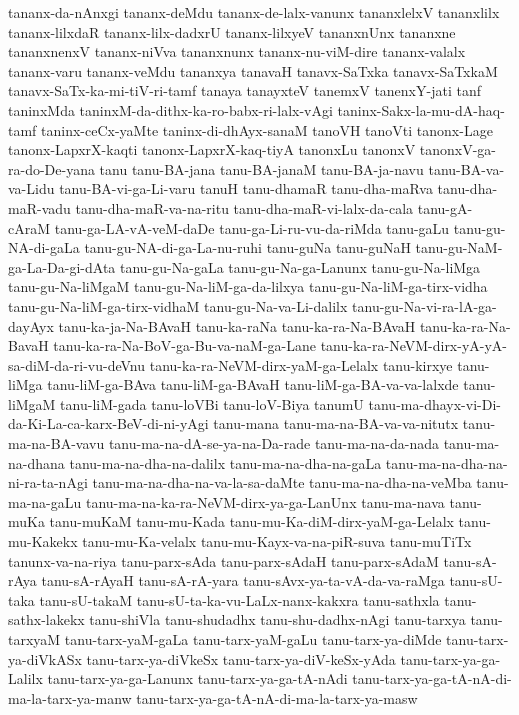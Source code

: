 {tananx-da-nAnxgi
tananx-deMdu
tananx-de-lalx-vanunx
tananxlelxV
tananxlilx
tananx-lilxdaR
tananx-lilx-dadxrU
tananx-lilxyeV
tananxnUnx
tananxne
tananxnenxV
tananx-niVva
tananxnunx
tananx-nu-viM-dire
tananx-valalx
tananx-varu
tananx-veMdu
tananxya
tanavaH
tanavx-SaTxka
tanavx-SaTxkaM
tanavx-SaTx-ka-mi-tiV-ri-tamf
tanaya
tanayxteV
tanemxV
tanenxY-jati
tanf
taninxMda
taninxM-da-dithx-ka-ro-babx-ri-lalx-vAgi
taninx-Sakx-la-mu-dA-haq-tamf
taninx-ceCx-yaMte
taninx-di-dhAyx-sanaM
tanoVH
tanoVti
tanonx-Lage
tanonx-LapxrX-kaqti
tanonx-LapxrX-kaq-tiyA
tanonxLu
tanonxV
tanonxV-ga-ra-do-De-yana
tanu
tanu-BA-jana
tanu-BA-janaM
tanu-BA-ja-navu
tanu-BA-va-va-Lidu
tanu-BA-vi-ga-Li-varu
tanuH
tanu-dhamaR
tanu-dha-maRva
tanu-dha-maR-vadu
tanu-dha-maR-va-na-ritu
tanu-dha-maR-vi-lalx-da-cala
tanu-gA-cAraM
tanu-ga-LA-vA-veM-daDe
tanu-ga-Li-ru-vu-da-riMda
tanu-gaLu
tanu-gu-NA-di-gaLa
tanu-gu-NA-di-ga-La-nu-ruhi
tanu-guNa
tanu-guNaH
tanu-gu-NaM-ga-La-Da-gi-dAta
tanu-gu-Na-gaLa
tanu-gu-Na-ga-Lanunx
tanu-gu-Na-liMga
tanu-gu-Na-liMgaM
tanu-gu-Na-liM-ga-da-lilxya
tanu-gu-Na-liM-ga-tirx-vidha
tanu-gu-Na-liM-ga-tirx-vidhaM
tanu-gu-Na-va-Li-dalilx
tanu-gu-Na-vi-ra-lA-ga-dayAyx
tanu-ka-ja-Na-BAvaH
tanu-ka-raNa
tanu-ka-ra-Na-BAvaH
tanu-ka-ra-Na-BavaH
tanu-ka-ra-Na-BoV-ga-Bu-va-naM-ga-Lane
tanu-ka-ra-NeVM-dirx-yA-yA-sa-diM-da-ri-vu-deVnu
tanu-ka-ra-NeVM-dirx-yaM-ga-Lelalx
tanu-kirxye
tanu-liMga
tanu-liM-ga-BAva
tanu-liM-ga-BAvaH
tanu-liM-ga-BA-va-va-lalxde
tanu-liMgaM
tanu-liM-gada
tanu-loVBi
tanu-loV-Biya
tanumU
tanu-ma-dhayx-vi-Di-da-Ki-La-ca-karx-BeV-di-ni-yAgi
tanu-mana
tanu-ma-na-BA-va-va-nitutx
tanu-ma-na-BA-vavu
tanu-ma-na-dA-se-ya-na-Da-rade
tanu-ma-na-da-nada
tanu-ma-na-dhana
tanu-ma-na-dha-na-dalilx
tanu-ma-na-dha-na-gaLa
tanu-ma-na-dha-na-ni-ra-ta-nAgi
tanu-ma-na-dha-na-va-la-sa-daMte
tanu-ma-na-dha-na-veMba
tanu-ma-na-gaLu
tanu-ma-na-ka-ra-NeVM-dirx-ya-ga-LanUnx
tanu-ma-nava
tanu-muKa
tanu-muKaM
tanu-mu-Kada
tanu-mu-Ka-diM-dirx-yaM-ga-Lelalx
tanu-mu-Kakekx
tanu-mu-Ka-velalx
tanu-mu-Kayx-va-na-piR-suva
tanu-muTiTx
tanunx-va-na-riya
tanu-parx-sAda
tanu-parx-sAdaH
tanu-parx-sAdaM
tanu-sA-rAya
tanu-sA-rAyaH
tanu-sA-rA-yara
tanu-sAvx-ya-ta-vA-da-va-raMga
tanu-sU-taka
tanu-sU-takaM
tanu-sU-ta-ka-vu-LaLx-nanx-kakxra
tanu-sathxla
tanu-sathx-lakekx
tanu-shiVla
tanu-shudadhx
tanu-shu-dadhx-nAgi
tanu-tarxya
tanu-tarxyaM
tanu-tarx-yaM-gaLa
tanu-tarx-yaM-gaLu
tanu-tarx-ya-diMde
tanu-tarx-ya-diVkASx
tanu-tarx-ya-diVkeSx
tanu-tarx-ya-diV-keSx-yAda
tanu-tarx-ya-ga-Lalilx
tanu-tarx-ya-ga-Lanunx
tanu-tarx-ya-ga-tA-nAdi
tanu-tarx-ya-ga-tA-nA-di-ma-la-tarx-ya-manw
tanu-tarx-ya-ga-tA-nA-di-ma-la-tarx-ya-masw
}
